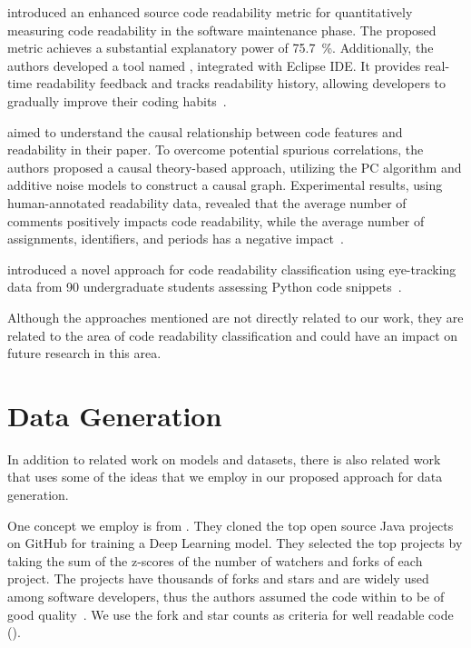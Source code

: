\documentclass[%
class=scrreprt,
chapterprefix=false,%
open=right,%
twoside=true,%
paper=a4,%
logofile={Logo\_zentral\_farbig\_EN.png},%
thesistype=master,%
UKenglish,%
]{se2thesis}
\theoremstyle{definition}
\begin{document}
	\citeauthor{choi2020metric} introduced an enhanced source code readability metric for quantitatively measuring code readability in the software maintenance phase. The proposed metric achieves a substantial explanatory power of 75.7~\%. Additionally, the authors developed a tool named , integrated with Eclipse IDE. It provides real-time readability feedback and tracks readability history, allowing developers to gradually improve their coding habits~\cite{choi2020metric}.
	
	\citeauthor{mi2023makes} aimed to understand the causal relationship between code features and readability in their paper. To overcome potential spurious correlations, the authors proposed a causal theory-based approach, utilizing the PC algorithm and additive noise models to construct a causal graph. Experimental results, using human-annotated readability data, revealed that the average number of comments positively impacts code readability, while the average number of assignments, identifiers, and periods has a negative impact~\cite{mi2023makes}.
	
	\citeauthor{segedinac2024assessing} introduced a novel approach for code readability classification using eye-tracking data from 90 undergraduate students assessing Python code snippets~\cite{segedinac2024assessing}.
	
	Although the approaches mentioned are not directly related to our work, they are related to the area of code readability classification and could have an impact on future research in this area.
	
\section{Data Generation} \label{Data Generation}

	In addition to related work on models and datasets, there is also related work that uses some of the ideas that we employ in our proposed approach for data generation. 
	
	One concept we employ is from \citeauthor{allamanis2016convolutional}. They cloned the top open source Java projects on GitHub for training a Deep Learning model. They selected the top projects by taking the sum of the z-scores of the number of watchers and forks of each project. The projects have thousands of forks and stars and are widely used among software developers, thus the authors assumed the code within to be of good quality~\cite{allamanis2016convolutional}. We use the fork and star counts as criteria for well readable code ().
	
\end{document}
